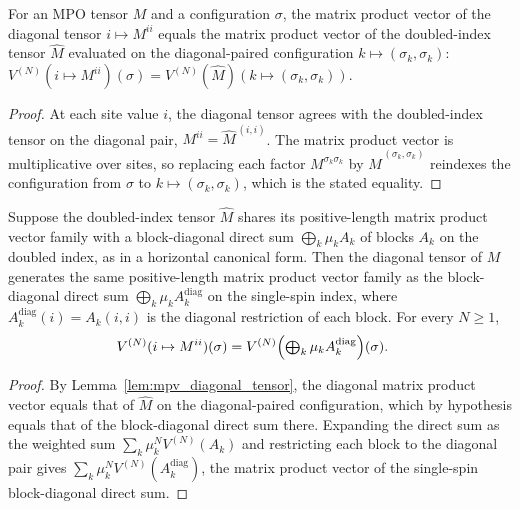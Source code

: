 \begin{lemma}
    \label{lem:mpv_diagonal_tensor}
    \leanok
    For an MPO tensor $M$ and a configuration $\sigma$, the matrix product vector of
    the diagonal tensor $i\mapsto M^{ii}$ equals the matrix product vector of the
    doubled-index tensor $\widehat{M}$ evaluated on the diagonal-paired configuration
    $k\mapsto(\sigma_k,\sigma_k)$:
    $V^{(N)}(i\mapsto M^{ii})(\sigma)
        =V^{(N)}(\widehat{M})(k\mapsto(\sigma_k,\sigma_k))$.
\end{lemma}
\begin{proof}\leanok
    At each site value $i$, the diagonal tensor agrees with the doubled-index tensor
    on the diagonal pair, $M^{ii}=\widehat{M}^{\,(i,i)}$.
    The matrix product vector is multiplicative over sites, so replacing each factor
    $M^{\sigma_k\sigma_k}$ by $\widehat{M}^{\,(\sigma_k,\sigma_k)}$ reindexes the
    configuration from $\sigma$ to $k\mapsto(\sigma_k,\sigma_k)$, which is the stated
    equality.
\end{proof}

\begin{lemma}
    \label{lem:mpv_diagonal_tensor_eq_blocks}
    \leanok
    Suppose the doubled-index tensor $\widehat{M}$ shares its positive-length matrix
    product vector family with a block-diagonal direct sum
    $\bigoplus_k\mu_kA_k$ of blocks $A_k$ on
    the doubled index, as in a horizontal canonical form. Then the diagonal tensor of
    $M$ generates the same positive-length matrix product vector family as the
    block-diagonal direct sum
    $\bigoplus_k\mu_kA_k^{\mathrm{diag}}$ on the single-spin index, where
    $A_k^{\mathrm{diag}}(i)=A_k(i,i)$ is the diagonal restriction of each block.
    For every $N\geq1$,
    \begin{align}
        V^{(N)}(i\mapsto M^{ii})(\sigma)
         & =V^{(N)}\Bigl(\textstyle\bigoplus_k
        \mu_kA_k^{\mathrm{diag}}\Bigr)(\sigma).
        \notag
    \end{align}
\end{lemma}
\begin{proof}\leanok
    By Lemma~\ref{lem:mpv_diagonal_tensor}, the diagonal matrix product vector equals
    that of $\widehat{M}$ on the diagonal-paired configuration, which by hypothesis
    equals that of the block-diagonal direct sum there. Expanding the direct sum as the
    weighted sum $\sum_k\mu_k^NV^{(N)}(A_k)$ and restricting each block to the
    diagonal pair gives $\sum_k\mu_k^NV^{(N)}(A_k^{\mathrm{diag}})$, the matrix
    product vector of the single-spin block-diagonal direct sum.
\end{proof}

